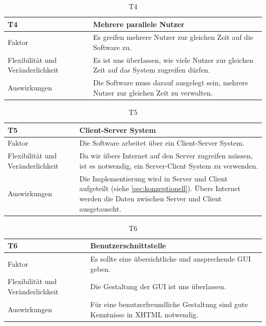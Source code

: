 \documentclass[fontsize=12pt,paper=a4,twoside]{scrartcl}
\begin{document}
\begin{table}[H]
\caption{T4}
\begin{tabular}{|p{3cm}|p{12cm}|}\hline
\textbf{T4} & \textbf{Mehrere parallele Nutzer} \\ \hline \hline
Faktor & Es greifen mehrere Nutzer zur gleichen Zeit auf die Software zu.\\ \hline
Flexibilität und Veränderlichkeit & Es ist uns überlassen, wie viele Nutzer zur gleichen Zeit auf das System zugreifen dürfen.  \\ \hline
Auswirkungen & Die Software muss darauf ausgelegt sein, mehrere Nutzer zur gleichen Zeit zu verwalten.\\ \hline
\end{tabular}
\end{table}

\begin{table}[H]
\caption{T5}
\begin{tabular}{|p{3cm}|p{12cm}|}\hline
\textbf{T5} & \textbf{Client-Server System} \\ \hline \hline
Faktor & Die Software arbeitet über ein Client-Server System.\\ \hline
Flexibilität und Veränderlichkeit & Da wir übers Internet auf den Server zugreifen müssen, ist es notwendig, ein Server-Client System zu verwenden. \\ \hline
Auswirkungen & Die Implementierung wird in Server und Client aufgeteilt (siehe \ref{sec:konzeptionell}). Übers Internet werden die Daten zwischen Server und Client ausgetauscht.\\ \hline
\end{tabular}
\end{table}

\begin{table}[H]
\caption{T6}
\begin{tabular}{|p{3cm}|p{12cm}|}\hline
\textbf{T6} & \textbf{Benutzerschnittstelle} \\ \hline \hline
Faktor & Es sollte eine übersichtliche und ansprechende GUI geben.\\ \hline
Flexibilität und Veränderlichkeit & Die Gestaltung der GUI ist uns überlassen. \\ \hline
Auswirkungen & Für eine benutzerfreundliche Gestaltung sind gute Kenntnisse in XHTML notwendig.\\ \hline
\end{tabular}
\end{table}
\end{document}
